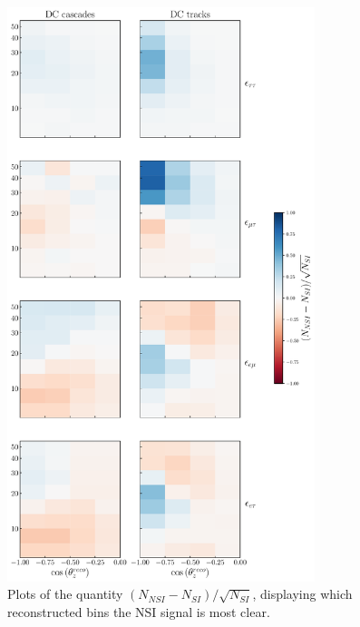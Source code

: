 \begin{figure}
    \begin{center}
        \includegraphics[width=0.8\textwidth]{figures/DC_event_pulls.pdf}
        \caption{Plots of the quantity $(N_{NSI} - N_{SI})/\sqrt{N_{SI}}$, displaying which 
        reconstructed bins the NSI signal is most clear.}
        \label{fig:event_pulls}
    \end{center}
\end{figure}

% 